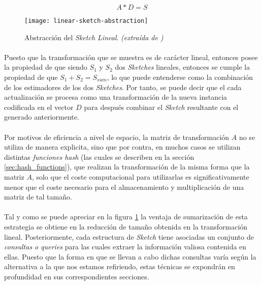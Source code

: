\documentclass{subfiles}
\begin{document}
        \begin{equation}
        \label{eq:linear_sketch}
          A  * D = S
        \end{equation}

        \begin{figure}
          \centering
          \texttt{[image: linear-sketch-abstraction]}
          \caption{Abstracción del \emph{Sketch Lineal}. \emph{(extraída de \cite{cormode2012synopses})}}
          \label{fig:linear_sketch}
        \end{figure}

        \paragraph{}
        Puesto que la transformación que se muestra es de carácter lineal, entonces posee la propiedad de que siendo $S_1$ y $S_2$ dos \emph{Sketches} lineales, entonces se cumple la propiedad de que $S_1 + S_2 = S_{sum}$, lo que puede entenderse como la combinación de los estimadores de los dos \emph{Sketches}. Por tanto, se puede decir que el cada actualización se procesa como una transformación de la nueva instancia codificada en el vector $D$ para después combinar el \emph{Sketch} resultante con el generado anteriormente.

        \paragraph{}
        Por motivos de eficiencia a nivel de espacio, la matriz de transformación $A$ no se utiliza de manera explicita, sino que por contra, en muchos casos se utilizan distintas \emph{funciones hash} (las cuales se describen en la sección \ref{sec:hash_functions}), que realizan la transformación de la misma forma que la matriz $A$, solo que el coste computacional para utilizarlas es significativamente menor que el coste necesario para el almacenamiento y multiplicación de una matriz de tal tamaño.

        \paragraph{}
        Tal y como se puede apreciar en la figura \ref{fig:linear_sketch} la ventaja de sumarización de esta estrategia se obtiene en la reducción de tamaño obtenida en la transformación lineal. Posteriormente, cada estructura de \emph{Sketch} tiene asociadas un conjunto de \emph{consultas o queries} para las cuales extraer la información valiosa contenida en ellas. Puesto que la forma en que se llevan a cabo dichas consultas varía según la alternativa a la que nos estamos refiriendo, estas técnicas se expondrán en profundidad en sus correspondientes secciones.
\end{document}

